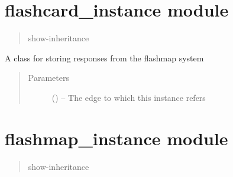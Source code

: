 \documentclass[letterpaper,10pt,english]{sphinxmanual}
\begin{document}
\chapter{flashcard\_instance module}
\label{\detokenize{flashcard_instance::doc}}\label{\detokenize{flashcard_instance:flashcard-instance-module}}\label{\detokenize{flashcard_instance:module-flashcard_instance}}\begin{quote}\begin{description}
\item[{show-inheritance}] \leavevmode
\end{description}\end{quote}

\begin{fulllineitems}
\label{\detokenize{flashcard_instance:flashcard_instance.FlashcardInstance}}
A class for storing responses from the flashmap system
\begin{quote}\begin{description}
\item[{Parameters}] \leavevmode
{} ({\hyperref[\detokenize{edge:edge.Edge}]{}}) -- The edge to which this instance refers

\end{description}\end{quote}

\end{fulllineitems}



\chapter{flashmap\_instance module}
\label{\detokenize{flashmap_instance:flashmap-instance-module}}\label{\detokenize{flashmap_instance:module-flashmap_instance}}\label{\detokenize{flashmap_instance::doc}}\begin{quote}\begin{description}
\item[{show-inheritance}] \leavevmode
\end{description}\end{quote}
\end{document}
